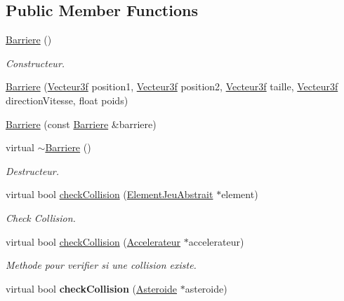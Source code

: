 \subsection*{Public Member Functions}
\begin{DoxyCompactItemize}
\item 
\hyperlink{group__inf2990_gacf2b80faa55444228db735390db40fc7}{Barriere} ()
\begin{DoxyCompactList}\small\item\em Constructeur. \end{DoxyCompactList}\item 
\hyperlink{group__inf2990_ga17283625d17ad9370a60c00357b1bf3e}{Barriere} (\hyperlink{group__utilitaire_ga6b2956069f76c7e27df4f79f87e5a48c}{Vecteur3f} position1, \hyperlink{group__utilitaire_ga6b2956069f76c7e27df4f79f87e5a48c}{Vecteur3f} position2, \hyperlink{group__utilitaire_ga6b2956069f76c7e27df4f79f87e5a48c}{Vecteur3f} taille, \hyperlink{group__utilitaire_ga6b2956069f76c7e27df4f79f87e5a48c}{Vecteur3f} direction\-Vitesse, float poids)
\item 
\hyperlink{group__inf2990_ga87db720230a9aced41fe2d33918f68d8}{Barriere} (const \hyperlink{class_barriere}{Barriere} \&barriere)
\item 
virtual \hyperlink{group__inf2990_ga99e534cc4cdddfce853a07d870270989}{$\sim$\-Barriere} ()
\begin{DoxyCompactList}\small\item\em Destructeur. \end{DoxyCompactList}\item 
\hypertarget{group__inf2990_gad85230f246a469fb21f367df473049a3}{virtual bool \hyperlink{group__inf2990_gad85230f246a469fb21f367df473049a3}{check\-Collision} (\hyperlink{class_element_jeu_abstrait}{Element\-Jeu\-Abstrait} $\ast$element)}\label{group__inf2990_gad85230f246a469fb21f367df473049a3}

\begin{DoxyCompactList}\small\item\em Check Collision. \end{DoxyCompactList}\item 
\hypertarget{class_barriere_ad512ec476e54d29b8edd022a31573764}{virtual bool \hyperlink{class_barriere_ad512ec476e54d29b8edd022a31573764}{check\-Collision} (\hyperlink{class_accelerateur}{Accelerateur} $\ast$accelerateur)}\label{class_barriere_ad512ec476e54d29b8edd022a31573764}

\begin{DoxyCompactList}\small\item\em Methode pour verifier si une collision existe. \end{DoxyCompactList}\item 
\hypertarget{group__inf2990_ga046dcb0b3592e83e6ceecb848c138185}{virtual bool {\bfseries check\-Collision} (\hyperlink{class_asteroide}{Asteroide} $\ast$asteroide)}\label{group__inf2990_ga046dcb0b3592e83e6ceecb848c138185}


\end{DoxyCompactItemize}
